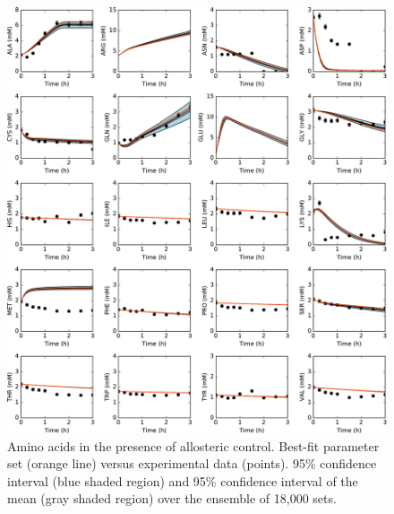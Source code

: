 \documentclass[12pt]{article}
\begin{document}
\begin{figure}[ht]
\centering
\includegraphics[width=1.00\textwidth]{./Figures/Amino.pdf}
\caption{Amino acids in the presence of allosteric control. Best-fit parameter set (orange line) versus experimental data (points). 95\% confidence interval (blue shaded region) and 95\% confidence interval of the mean (gray shaded region) over the ensemble of 18,000 sets.}
\label{fig:Amino}
\end{figure}
\end{document}
